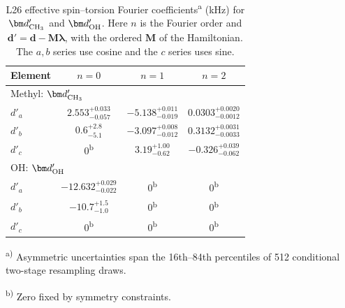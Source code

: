 \begin{table}
\begingroup
\caption{L26 effective spin--torsion Fourier coefficients\textsuperscript{a}
(kHz) for $\bm d^{\prime}_{\rm CH_3}$ and $\bm d^{\prime}_{\rm OH}$.
Here $n$ is the Fourier order and $\bm d'=\bm d-\bm M\bm\lambda$,
with the ordered $\bm M$ of the Hamiltonian. The $a,b$ series use cosine and the $c$ series uses sine.}
\label{tab:fit-st}
\centering
\begingroup
\small
\setlength{\tabcolsep}{3.5pt}
\renewcommand{\arraystretch}{1.0}
\begin{tabular}{lccc}
\toprule
Element & $n=0$ & $n=1$ & $n=2$\\
\midrule
\multicolumn{4}{l}{Methyl: $\bm d^{\prime}_{\rm CH_3}$}\\
$d'_{a}$ & ${2.553}_{-0.057}^{+0.033}$ & ${-5.138}_{-0.019}^{+0.011}$ & ${0.0303}_{-0.0012}^{+0.0020}$ \\
$d'_{b}$ & ${0.6}_{-5.1}^{+2.8}$ & ${-3.097}_{-0.012}^{+0.008}$ & ${0.3132}_{-0.0033}^{+0.0031}$ \\
$d'_{c}$ & $0$\textsuperscript{b} & ${3.19}_{-0.62}^{+1.00}$ & ${-0.326}_{-0.062}^{+0.039}$ \\
\midrule
\multicolumn{4}{l}{OH: $\bm d^{\prime}_{\rm OH}$}\\
$d'_{a}$ & ${-12.632}_{-0.022}^{+0.029}$ & $0$\textsuperscript{b} & $0$\textsuperscript{b} \\
$d'_{b}$ & ${-10.7}_{-1.0}^{+1.5}$ & $0$\textsuperscript{b} & $0$\textsuperscript{b} \\
$d'_{c}$ & $0$\textsuperscript{b} & $0$\textsuperscript{b} & $0$\textsuperscript{b} \\
\bottomrule
\end{tabular}
\endgroup

\par\vspace{3pt}
\begin{minipage}{\linewidth}
\footnotesize\raggedright
\textsuperscript{a)} Asymmetric uncertainties span the 16th--84th percentiles of 512 conditional two-stage resampling draws.\par
\textsuperscript{b)} Zero fixed by symmetry constraints.\par
\end{minipage}
\par\endgroup
\end{table}

